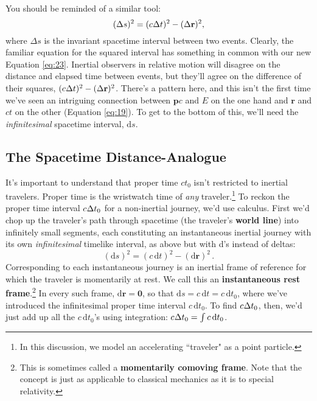 \documentclass[12pt]{article}
\renewcommand{\vv}[1]{\mathbf{#1}}
\newcommand{\dd}[1]{\mathrm{d}#1}
\begin{document}
You should be reminded of a similar tool:
\begin{equation*}
(\Delta s)^2 = (c \mkern.5mu \Delta t)^2 - (\Delta \vv r)^2,
\end{equation*}
where $\Delta s$ is the invariant spacetime interval between two events. Clearly, the familiar equation for the squared interval has something in common with our new Equation \ref{eq:23}. Inertial observers in relative motion will disagree on the distance and elapsed time between events, but they'll agree on the difference of their squares, $(c \mkern.5mu \Delta t)^2 - (\Delta \vv r)^2$. There's a pattern here, and this isn't the first time we've seen an intriguing connection between $\vv p c$ and $E$ on the one hand and $\vv r$ and $ct$ on the other (Equation \ref{eq:19}). To get to the bottom of this, we'll need the \emph{infinitesimal} spacetime interval, $\dd s$.

\subsection{The Spacetime Distance-Analogue}\label{ssec:ds}

It's important to understand that proper time $ct_0$ isn't restricted to inertial travelers. Proper time is the wristwatch time of \emph{any} traveler.\footnote{\label{fn:tr}In this discussion, we model an accelerating ``traveler" as a point particle.} To reckon the proper time interval $c \mkern.5mu \Delta t_0$ for a non-inertial journey, we'd use calculus. First we'd chop up the traveler's path through spacetime (the traveler's \textbf{world line}) into infinitely small segments, each constituting an instantaneous inertial journey with its own \emph{infinitesimal} timelike interval, as above but with d's instead of deltas:
\begin{equation}\label{eq:24}
\boxed{(\dd s)^2 =(c \, \dd t)^2 - (\dd \vv r)^2} \, .
\end{equation}
Corresponding to each instantaneous journey is an inertial frame of reference for which the traveler is momentarily at rest. We call this an \textbf{instantaneous rest frame}.\footnote{This is sometimes called a \textbf{momentarily comoving frame}. Note that the concept is just as applicable to classical mechanics as it is to special relativity.} In every such frame, $\dd \vv r = \vv 0$, so that $\dd s = c \,\dd t = c \, \dd t_0$, where we've introduced the infinitesimal proper time interval $c \, \dd t_0$. To find $c \mkern.5mu \Delta t_0$, then, we'd just add up all the $c \, \dd t_0$'s using integration: $c \mkern.5mu \Delta t_0 = \int c \, \dd t_0$.
\end{document}
